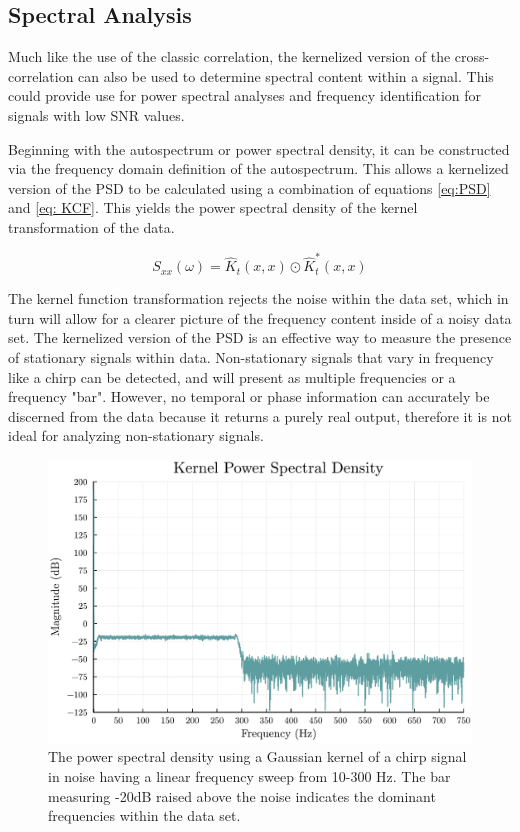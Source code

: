 
    \subsection{Spectral Analysis}

    Much like the use of the classic correlation, the kernelized version of the cross-correlation can also be used to determine spectral content within a signal. This could provide use for power spectral analyses and frequency identification for signals with low SNR values. 

    Beginning with the autospectrum or power spectral density, it can be constructed via the frequency domain definition of the autospectrum. This allows a kernelized version of the PSD to be calculated using a combination of equations \ref{eq:PSD} and \ref{eq: KCF}. This yields the power spectral density of the kernel transformation of the data. 

    \begin{equation} \label{eq:KPSD}
        {S}_{xx}(\omega) = \hat{K}_t(x, x) \odot \hat{K}_t^*(x, x)
    \end{equation}

    The kernel function transformation rejects the noise within the data set, which in turn will allow for a clearer picture of the frequency content inside of a noisy data set. The kernelized version of the PSD is an effective way to measure the presence of stationary signals within data. Non-stationary signals that vary in frequency like a chirp can be detected, and will present as multiple frequencies or a frequency "bar". However, no temporal or phase information can accurately be discerned from the data because it returns a purely real output, therefore it is not ideal for analyzing non-stationary signals. 

    \begin{figure}[h]
        \centering
        \includegraphics[scale = 0.5]{images/Formulation/KPSD example.pdf}
        \caption{The power spectral density using a Gaussian kernel of a chirp signal in noise having a linear frequency sweep from 10-300 Hz. The bar measuring -20dB raised above the noise indicates the dominant frequencies within the data set.}
        \label{fig:kpsd example}
    \end{figure}

